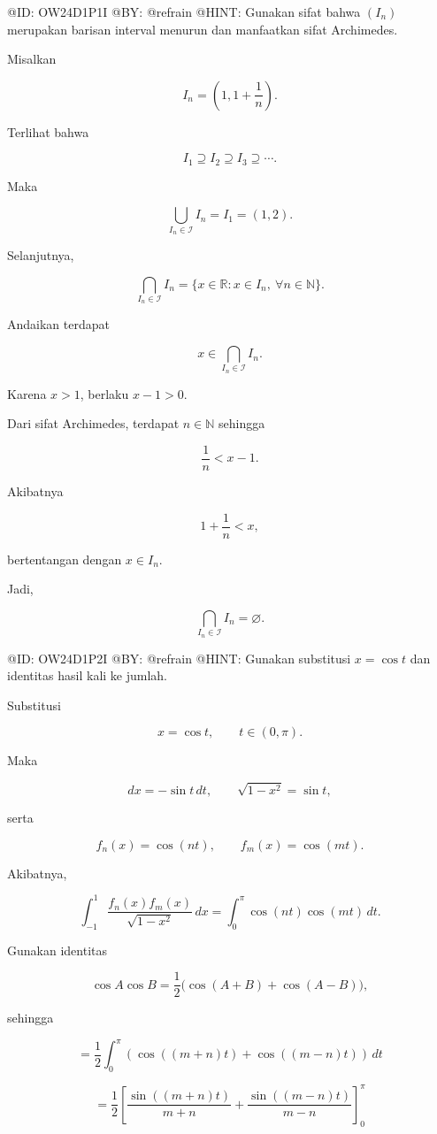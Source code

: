 @ID: OW24D1P1I
@BY: @refrain
@HINT: Gunakan sifat bahwa $(I_n)$ merupakan barisan interval menurun dan manfaatkan sifat Archimedes.

Misalkan

$$
I_n=\left(1,1+\frac1n\right).
$$

Terlihat bahwa

$$
I_1\supseteq I_2\supseteq I_3\supseteq\cdots.
$$

Maka

$$
\bigcup_{I_n\in\mathcal I}I_n
=I_1
=(1,2).
$$

Selanjutnya,

$$
\bigcap_{I_n\in\mathcal I}I_n
=\{x\in\mathbb R:x\in I_n,\ \forall n\in\mathbb N\}.
$$

Andaikan terdapat

$$
x\in\bigcap_{I_n\in\mathcal I}I_n.
$$

Karena $x>1$, berlaku $x-1>0$.

Dari sifat Archimedes, terdapat $n\in\mathbb N$ sehingga

$$
\frac1n<x-1.
$$

Akibatnya

$$
1+\frac1n<x,
$$

bertentangan dengan $x\in I_n$.

Jadi,

$$
\boxed{\bigcap_{I_n\in\mathcal I}I_n=\varnothing.}
$$


@ID: OW24D1P2I
@BY: @refrain
@HINT: Gunakan substitusi $x=\cos t$ dan identitas hasil kali ke jumlah.

Substitusi

$$
x=\cos t,\qquad t\in(0,\pi).
$$

Maka

$$
dx=-\sin t\,dt,\qquad
\sqrt{1-x^2}=\sin t,
$$

serta

$$
f_n(x)=\cos(nt),\qquad
f_m(x)=\cos(mt).
$$

Akibatnya,

$$
\int_{-1}^{1}\frac{f_n(x)f_m(x)}{\sqrt{1-x^2}}\,dx
=\int_0^\pi\cos(nt)\cos(mt)\,dt.
$$

Gunakan identitas

$$
\cos A\cos B
=\frac12\bigl(\cos(A+B)+\cos(A-B)\bigr),
$$

sehingga

$$
=\frac12\int_0^\pi
\left(\cos((m+n)t)+\cos((m-n)t)\right)\,dt
$$

$$
=\frac12\left[
\frac{\sin((m+n)t)}{m+n}
+\frac{\sin((m-n)t)}{m-n}
\right]_0^\pi
$$

